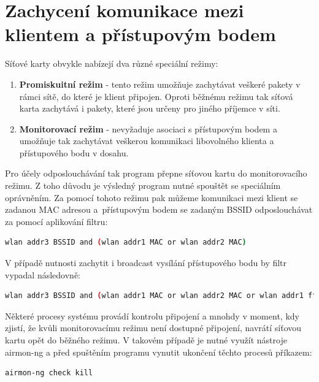 \section{Zachycení komunikace mezi klientem a přístupovým bodem}
Síťové karty obvykle nabízejí dva různé speciální režimy:
\begin{enumerate}
  \item{\textbf{Promiskuitní režim} - tento režim umožňuje zachytávat veškeré pakety v rámci sítě, do které je klient připojen. Oproti běžnému režimu tak síťová karta zachytává i pakety, které jsou určeny pro jiného příjemce v síti.}
  \item{\textbf{Monitorovací režim} - nevyžaduje asociaci s přístupovým bodem a umožňuje tak zachytávat veškerou komunikaci libovolného klienta a přístupového bodu v dosahu.}
\end{enumerate}
Pro účely odposlouchávání tak program přepne síťovou kartu do monitorovacího režimu. Z toho důvodu je výsledný program nutné spouštět se speciálním oprávněním. Za pomocí tohoto režimu pak můžeme komunikaci mezi klient se zadanou MAC adresou a~přístupovým bodem se zadaným BSSID odposlouchávat za pomocí aplikování filtru:
\begin{lstlisting}[language=bash]
wlan addr3 BSSID and (wlan addr1 MAC or wlan addr2 MAC)
\end{lstlisting}
V případě nutnosti zachytit i broadcast vysílání přístupového bodu by filtr vypadal následovně:
\begin{lstlisting}[language=bash]
wlan addr3 BSSID and (wlan addr1 MAC or wlan addr2 MAC or wlan addr1 ff:ff:ff:ff:ff:ff)
\end{lstlisting}

Některé procesy systému provádí kontrolu připojení a mnohdy v moment, kdy zjistí, že kvůli monitorovacímu režimu není dostupné připojení, navrátí síťovou kartu opět do běžného režimu. V takovém případě je nutné využít nástroje airmon-ng a před spuštěním programu vynutit ukončení těchto procesů příkazem:
\begin{lstlisting}[language=bash]
airmon-ng check kill
\end{lstlisting}

